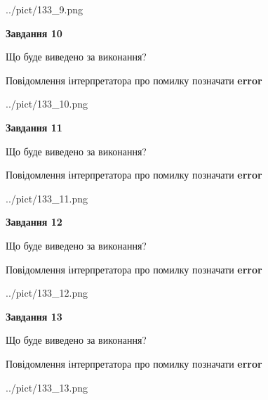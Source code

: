 \documentclass[11pt, ukrainian]{article}
\begin{document}
{\begin {large}
\begin{center}
	{../pict/133_9.png}
\end{center}
\newpage

{\begin {center}\textbf{Завдання 10}\end {center}}\par
Що буде виведено за виконання? \par
Повідомлення інтерпретатора про помилку позначати \textbf{error}

\begin{center}
	{../pict/133_10.png}
\end{center}
\newpage

{\begin {center}\textbf{Завдання 11}\end {center}}\par
Що буде виведено за виконання? \par
Повідомлення інтерпретатора про помилку позначати \textbf{error}

\begin{center}
	{../pict/133_11.png}
\end{center}
\newpage

{\begin {center}\textbf{Завдання 12}\end {center}}\par
Що буде виведено за виконання? \par
Повідомлення інтерпретатора про помилку позначати \textbf{error}

\begin{center}
	{../pict/133_12.png}
\end{center}
\newpage

{\begin {center}\textbf{Завдання 13}\end {center}}\par
Що буде виведено за виконання? \par
Повідомлення інтерпретатора про помилку позначати \textbf{error}

\begin{center}
	{../pict/133_13.png}
\end{center}
\newpage


\end{large}}
\end{document}
